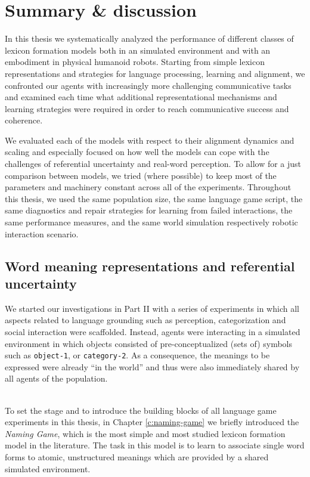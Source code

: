 
\setcounter{chapter}{10}

\chapter{Summary \& discussion}
\label{c:chapter-11}

In this thesis we systematically analyzed the performance of different
classes of lexicon formation models both in an simulated environment
and with an embodiment in physical humanoid robots. Starting from
simple lexicon representations and strategies for language processing,
learning and alignment, we confronted our agents with increasingly
more challenging communicative tasks and examined each time what
additional representational mechanisms and learning strategies were
required in order to reach communicative success and coherence.

We evaluated each of the models with respect to their alignment
dynamics and scaling and especially focused on how well the models can
cope with the challenges of referential uncertainty and real-word
perception. To allow for a just comparison between models, we tried
(where possible) to keep most of the parameters and machinery constant
across all of the experiments. Throughout this thesis, we used the
same population size, the same language game script, the same
diagnostics and repair strategies for learning from failed
interactions, the same performance measures, and the same world
simulation respectively robotic interaction scenario.



\section{Word meaning representations and referential uncertainty}

We started our investigations in Part II with a series of experiments
in which all aspects related to language grounding such as perception,
categorization and social interaction were scaffolded. Instead, agents
were interacting in a simulated environment in which objects
consisted of pre-conceptualized (sets of) symbols such as
\texttt{object-1}, or \texttt{category-2}. As a consequence, the
meanings to be expressed were already ``in the world'' and thus were
also immediately shared by all agents of the population.

~\\

 To set the stage and to introduce the building blocks of
all language game experiments in this thesis, in Chapter
\ref{c:naming-game} we briefly introduced the \emph{Naming Game},
which is the most simple and most studied lexicon formation model in
the literature. The task in this model is to learn to associate single
word forms to atomic, unstructured meanings which are provided by a
shared simulated environment. 

